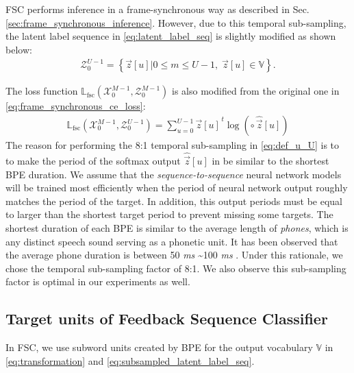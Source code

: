 \documentclass{article}
\begin{document}
FSC performs inference in a frame-synchronous way as described in 
Sec. \ref{sec:frame_synchronous_inference}. 
However, due to this temporal sub-sampling, the latent label sequence 
in \eqref{eq:latent_label_seq} is slightly modified as shown below:
\begin{align}
  \mathcal{Z}_{0}^{U-1}  =  
    \left\{\vec{z}[u]  \Big| 0 \le m \le U-1, \; \vec{z}[u] \in \mathbb{V} \right\}.
  \label{eq:subsampled_latent_label_seq}
\end{align}


The loss function 
$\mathbb{L}_{\text{fsc}}\left(\mathcal{X}_{0}^{M-1}, \mathcal{Z}_{0}^{M-1}\right)$ 
is also modified from the original one in 
\eqref{eq:frame_synchronous_ce_loss}:
\begin{align}
	\mathbb{L}_{\text{fsc}}
		\left(\mathcal{X}_{0}^{M-1}, \mathcal{Z}_{0}^{U-1}\right)
      = \sum_{u=0}^{U-1}  {\vec{z}[u]}^{\,t}  \log\left( 
          \circ \, \widehat{\vec{z}}[u] \right)  
        \label{eq:fsc_ce_loss} 
\end{align}
The reason for performing the 8:1 temporal sub-sampling in \eqref{eq:def_u_U} is to 
to make the period of the softmax output $\widehat{\vec{z}}[u]$ in \label{eq:fsc_ce_loss} 
be similar to the shortest BPE duration. We assume that the {\it sequence-to-sequence}
neural network models will be trained most efficiently when the period of neural 
network output roughly matches the period of the target. In addition, this
output periods must be equal to larger than the shortest target period to prevent
missing some targets.
The shortest duration of each BPE is similar to the average length of {\it phones}, 
which is any distinct speech sound serving as a phonetic unit.
It has been observed that the average phone duration is between 50 {\it ms}
\textasciitilde 100 {\it ms} \cite{x_wang_icslp_1996_00, z_bartosz_ltc_2009_00}.
Under this rationale, we chose the temporal sub-sampling factor of 8:1. 
We also observe this sub-sampling factor is optimal in our experiments as well.

\subsection{Target units of Feedback Sequence Classifier}
\label{sec:target_units}

In FSC, we use subword units created by BPE \cite{r_sennrich_acl_2016_00} for
the output vocabulary $\mathbb{V}$ in 
\eqref{eq:transformation} and \eqref{eq:subsampled_latent_label_seq}. 
\end{document}

